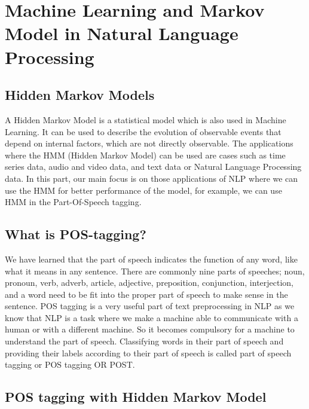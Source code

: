 \section{Machine Learning and Markov Model in Natural Language Processing}

\vspace{2cm}
    \subsection{Hidden Markov Models}
    
    A Hidden Markov Model is a statistical model which is also used in Machine Learning. It can be used to describe the evolution of observable events that depend on internal factors, which are not directly observable.
    The applications where the HMM (Hidden Markov Model) can be used are cases such as time series data, audio and video data, and text data or Natural Language Processing data. In this part, our main focus is on those applications of NLP where we can use the HMM for better performance of the model, for example, we can use HMM in the Part-Of-Speech tagging.
    
    \vspace{0.5cm}
    \subsection{What is POS-tagging?}
    
    We have learned that the part of speech indicates the function of any word, like what it means in any sentence. There are commonly nine parts of speeches; noun, pronoun, verb, adverb, article, adjective, preposition, conjunction, interjection, and a word need to be fit into the proper part of speech to make sense in the sentence. 
    POS tagging is a very useful part of text preprocessing in NLP as we know that NLP is a task where we make a machine able to communicate with a human or with a different machine. So it becomes compulsory for a machine to understand the part of speech.
    Classifying words in their part of speech and providing their labels according to their part of speech is called part of speech tagging or POS tagging OR POST.
    
    \vspace{0.5cm}
    \subsection{POS tagging with Hidden Markov Model}
    
